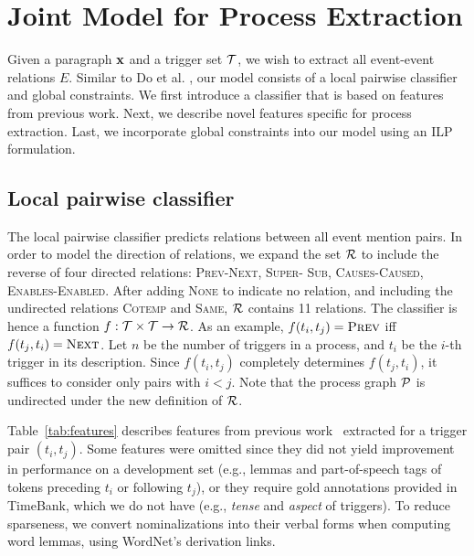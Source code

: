 \section{Joint Model for Process Extraction}

Given a paragraph $\mathbf{x}$ and a trigger set $\mathcal{T}$, we wish to extract all event-event relations $E$. Similar to Do et al. , our model consists of a local pairwise classifier and global constraints. We first introduce a classifier that is based on features from previous work. Next, we describe novel features specific for process extraction. Last, we incorporate global constraints into our model using an ILP formulation.

\subsection{Local pairwise classifier} \label{subsec:pairwise}

The local pairwise classifier predicts relations between all event mention pairs. In order to model the direction of relations, we expand the set $\mathcal{R}$ to include the reverse of four directed relations: \textsc{Prev}-\textsc{Next},  \textsc{Super}- \textsc{Sub}, \textsc{Causes}-\textsc{Caused}, \textsc{Enables}-\textsc{Enabled}. After adding \textsc{None} to indicate no relation, and including the undirected relations \textsc{Cotemp} and \textsc{Same}, $\mathcal{R}$ contains 11 relations. The classifier is hence a function $f:\mathcal{T} \times \mathcal{T} \rightarrow \mathcal{R}$. As an example, $f(t_i,t_j)=\mbox{\textsc{Prev}}$ iff $f(t_j,t_i)=\mbox{\textsc{Next}}$. Let $n$ be the number of triggers in a process, and $t_i$ be the $i$-th trigger in its description. Since $f(t_i,t_j)$ completely determines $f(t_j,t_i)$, it suffices to consider only pairs with $i<j$. Note that the process graph $\mathcal{P}$ is undirected under the new definition of $\mathcal{R}$.

Table~\ref{tab:features} describes features from previous work~\cite{Chambers08,Do12} extracted for a trigger pair $(t_i,t_j)$. Some features were omitted since they did not yield improvement in performance on a development set (e.g., lemmas and part-of-speech tags of tokens preceding $t_i$ or following $t_j$), or they require gold annotations provided in TimeBank, which we do not have (e.g., \emph{tense} and \emph{aspect} of triggers). To reduce sparseness, we convert nominalizations into their verbal forms when computing word lemmas, using WordNet's \cite{Fellbaum1998} derivation links.

